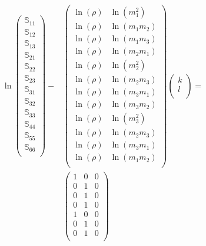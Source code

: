 \documentclass[a4paper,fleqn]{DC_ArtStyle}
\begin{document}
\begin{equation}
	\begin{split}
		\ln
		\begin{pmatrix}
			\mathbb{S}_{11} \\
			\mathbb{S}_{12} \\
			\mathbb{S}_{13} \\
			\mathbb{S}_{21} \\
			\mathbb{S}_{22} \\
			\mathbb{S}_{23} \\
			\mathbb{S}_{31} \\
			\mathbb{S}_{32} \\
			\mathbb{S}_{33} \\
			\mathbb{S}_{44} \\
			\mathbb{S}_{55} \\
			\mathbb{S}_{66} \\
		\end{pmatrix} - & \begin{pmatrix}
			\ln(\rho) & \ln(m_1^2) \\
			\ln(\rho) & \ln(m_1 m_2) \\
			\ln(\rho) & \ln(m_1 m_3) \\
			\ln(\rho) & \ln(m_2 m_1) \\
			\ln(\rho) & \ln(m_2^2) \\
			\ln(\rho) & \ln(m_2 m_3) \\
			\ln(\rho) & \ln(m_3 m_1) \\
			\ln(\rho) & \ln(m_3 m_2) \\
			\ln(\rho) & \ln(m_3^2) \\
			\ln(\rho) & \ln(m_2 m_3) \\
			\ln(\rho) & \ln(m_3 m_1) \\
			\ln(\rho) & \ln(m_1 m_2) \\
		\end{pmatrix} \begin{pmatrix}
			k \\
			l \\
		\end{pmatrix} = \\ & \begin{pmatrix}
			1 & 0 & 0 \\
			0 & 1 & 0 \\
			0 & 1 & 0 \\
			0 & 1 & 0 \\
			1 & 0 & 0 \\
			0 & 1 & 0 \\
			0 & 1 & 0 \\

\end{pmatrix}
\end{split}
\end{equation}
\end{document}

